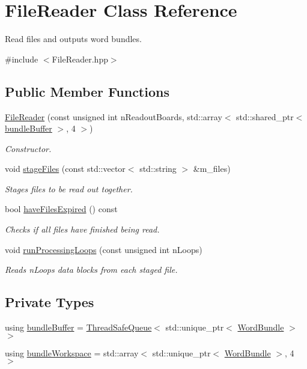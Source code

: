 \hypertarget{class_file_reader}{}\section{File\+Reader Class Reference}
\label{class_file_reader}


Read files and outputs word bundles.  




{\ttfamily \#include $<$File\+Reader.\+hpp$>$}

\subsection*{Public Member Functions}
\begin{DoxyCompactItemize}
\item 
\hyperlink{class_file_reader_af7f6550dfccc640680792a51d997adca}{File\+Reader} (const unsigned int n\+Readout\+Boards, std\+::array$<$ std\+::shared\+\_\+ptr$<$ \hyperlink{class_file_reader_ac755c1e271610c2c12a7fc5b55cc048b}{bundle\+Buffer} $>$, 4 $>$)
\begin{DoxyCompactList}\small\item\em Constructor. \end{DoxyCompactList}\item 
void \hyperlink{class_file_reader_a578a03fc3bf266f3d6d54542bf687579}{stage\+Files} (const std\+::vector$<$ std\+::string $>$ \&m\+\_\+files)
\begin{DoxyCompactList}\small\item\em Stages files to be read out together. \end{DoxyCompactList}\item 
bool \hyperlink{class_file_reader_a58b80f2c9c2ec8381527bdfca1008007}{have\+Files\+Expired} () const
\begin{DoxyCompactList}\small\item\em Checks if all files have finished being read. \end{DoxyCompactList}\item 
void \hyperlink{class_file_reader_a478ed77f1b8f76e15cb2faa8964a26e6}{run\+Processing\+Loops} (const unsigned int n\+Loops)
\begin{DoxyCompactList}\small\item\em Reads n\+Loops data blocks from each staged file. \end{DoxyCompactList}\end{DoxyCompactItemize}
\subsection*{Private Types}
\begin{DoxyCompactItemize}
\item 
using \hyperlink{class_file_reader_ac755c1e271610c2c12a7fc5b55cc048b}{bundle\+Buffer} = \hyperlink{class_thread_safe_queue}{Thread\+Safe\+Queue}$<$ std\+::unique\+\_\+ptr$<$ \hyperlink{class_word_bundle}{Word\+Bundle} $>$ $>$
\item 
using \hyperlink{class_file_reader_a7fb625dc45cee3256d37cc19c65cad86}{bundle\+Workspace} = std\+::array$<$ std\+::unique\+\_\+ptr$<$ \hyperlink{class_word_bundle}{Word\+Bundle} $>$, 4 $>$
\end{DoxyCompactItemize}
